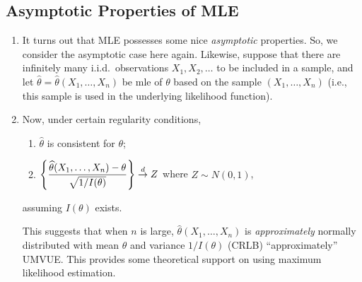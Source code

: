 \subsection{Asymptotic Properties of MLE}
\begin{enumerate}
\item It turns out that MLE possesses some nice \emph{asymptotic} properties.
So, we consider the asymptotic case here again. Likewise, suppose that there
are infinitely many i.i.d.\ observations \(X_1,X_2,\dotsc\) to be included in a sample,
and let \(\widehat{\theta}=\widehat{\theta}(X_1,\dotsc,X_n)\) be mle of
\(\theta\) based on the sample \((X_1,\dotsc,X_n)\) (i.e., this sample is used
in the underlying likelihood function).

\item \label{it:mle-asym-prop}
Now, under certain regularity conditions,
\begin{enumerate}
\item \(\widehat{\theta}\) is consistent for \(\theta\);
\item \(\displaystyle \left\{\frac{\widehat{\theta}(X_1,\dotsc,X_n)-\theta}{\sqrt{1/I(\theta)}}\right\}\overset{d}{\to} Z\) where \(Z\sim N(0,1)\),
\end{enumerate}
assuming \(I(\theta)\) exists.

\begin{note}
This suggests that when \(n\) is large, \(\widehat{\theta}(X_1,\dotsc,X_n)\)
is \emph{approximately} normally distributed with mean \(\theta\) and variance \(1/I(\theta)\) (CRLB)
 ``approximately'' UMVUE. This provides some theoretical
support on using maximum likelihood estimation.
\end{note}
\end{enumerate}

